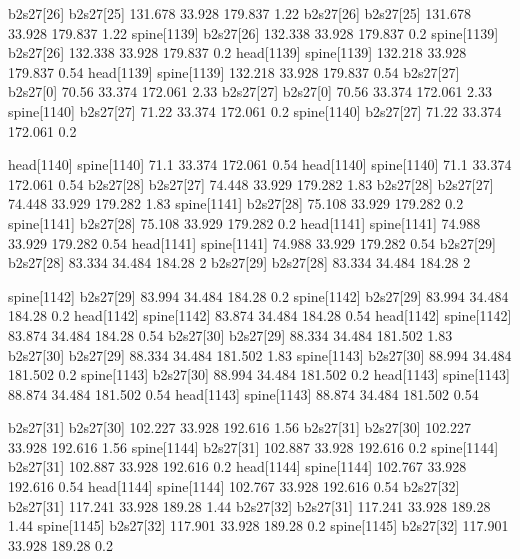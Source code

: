 b2s27[26]    b2s27[25]    131.678    33.928    179.837    1.22
b2s27[26]    b2s27[25]    131.678    33.928    179.837    1.22
spine[1139]    b2s27[26]    132.338    33.928    179.837    0.2
spine[1139]    b2s27[26]    132.338    33.928    179.837    0.2
head[1139]    spine[1139]    132.218    33.928    179.837    0.54
head[1139]    spine[1139]    132.218    33.928    179.837    0.54
b2s27[27]    b2s27[0]    70.56    33.374    172.061    2.33
b2s27[27]    b2s27[0]    70.56    33.374    172.061    2.33
spine[1140]    b2s27[27]    71.22    33.374    172.061    0.2
spine[1140]    b2s27[27]    71.22    33.374    172.061    0.2


head[1140]    spine[1140]    71.1    33.374    172.061    0.54
head[1140]    spine[1140]    71.1    33.374    172.061    0.54
b2s27[28]    b2s27[27]    74.448    33.929    179.282    1.83
b2s27[28]    b2s27[27]    74.448    33.929    179.282    1.83
spine[1141]    b2s27[28]    75.108    33.929    179.282    0.2
spine[1141]    b2s27[28]    75.108    33.929    179.282    0.2
head[1141]    spine[1141]    74.988    33.929    179.282    0.54
head[1141]    spine[1141]    74.988    33.929    179.282    0.54
b2s27[29]    b2s27[28]    83.334    34.484    184.28    2
b2s27[29]    b2s27[28]    83.334    34.484    184.28    2


spine[1142]    b2s27[29]    83.994    34.484    184.28    0.2
spine[1142]    b2s27[29]    83.994    34.484    184.28    0.2
head[1142]    spine[1142]    83.874    34.484    184.28    0.54
head[1142]    spine[1142]    83.874    34.484    184.28    0.54
b2s27[30]    b2s27[29]    88.334    34.484    181.502    1.83
b2s27[30]    b2s27[29]    88.334    34.484    181.502    1.83
spine[1143]    b2s27[30]    88.994    34.484    181.502    0.2
spine[1143]    b2s27[30]    88.994    34.484    181.502    0.2
head[1143]    spine[1143]    88.874    34.484    181.502    0.54
head[1143]    spine[1143]    88.874    34.484    181.502    0.54


b2s27[31]    b2s27[30]    102.227    33.928    192.616    1.56
b2s27[31]    b2s27[30]    102.227    33.928    192.616    1.56
spine[1144]    b2s27[31]    102.887    33.928    192.616    0.2
spine[1144]    b2s27[31]    102.887    33.928    192.616    0.2
head[1144]    spine[1144]    102.767    33.928    192.616    0.54
head[1144]    spine[1144]    102.767    33.928    192.616    0.54
b2s27[32]    b2s27[31]    117.241    33.928    189.28    1.44
b2s27[32]    b2s27[31]    117.241    33.928    189.28    1.44
spine[1145]    b2s27[32]    117.901    33.928    189.28    0.2
spine[1145]    b2s27[32]    117.901    33.928    189.28    0.2


